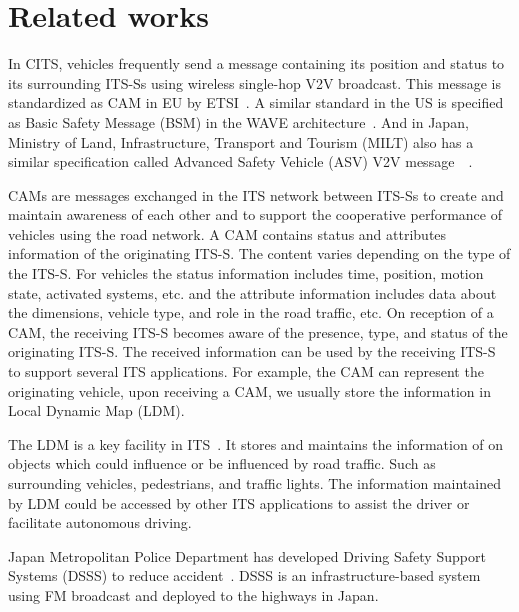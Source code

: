 \section{Related works} \label{sec:related_works}

In CITS, vehicles frequently send a message containing its position
and status to its surrounding ITS-Ss using wireless single-hop V2V broadcast.
This message is standardized as CAM in EU by ETSI~\cite{etsi2014302}.
A similar standard in the US is specified as Basic Safety Message (BSM) in the WAVE architecture~\cite{dsrc2945dsrc}.
And in Japan, Ministry of Land, Infrastructure,
Transport and Tourism (MILT) also has a similar specification called
Advanced Safety Vehicle (ASV) V2V message~\cite{takahashi2000introduction}~\cite{matsumoto1997toyota}.

CAMs are messages exchanged in the ITS network between ITS-Ss to create and maintain awareness of each other
and to support the cooperative performance of vehicles using the road network.
A CAM contains status and attributes information of the originating ITS-S.
The content varies depending on the type of the ITS-S.
For vehicles the status information includes time, position, motion state, activated systems,
etc. and the attribute information includes data about the dimensions,
vehicle type, and role in the road traffic, etc.
On reception of a CAM, the receiving ITS-S becomes aware of the presence, type, and status of the originating ITS-S.
The received information can be used by the receiving ITS-S to support several ITS applications.
For example, the CAM can represent the originating vehicle, upon receiving a CAM,
we usually store the information in Local Dynamic Map (LDM).

The LDM is a key facility in ITS~\cite{etsi2014302895}.
It stores and maintains the information of on objects which could influence or be influenced by road traffic.
Such as surrounding vehicles, pedestrians, and traffic lights.
The information maintained by LDM could be accessed by other ITS applications to assist the driver or facilitate autonomous driving.

Japan Metropolitan Police Department has developed Driving Safety Support Systems (DSSS) to reduce accident~\cite{yamamoto2006aichi}.
DSSS is an infrastructure-based system using FM broadcast and deployed to the highways in Japan.

